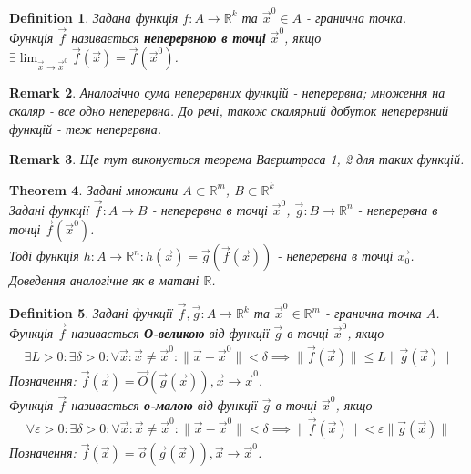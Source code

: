 \documentclass[a4paper, 10pt]{article}
\def\huge{\displaystyle}
\theoremstyle{theoremdd}
\newtheorem{theorem}{Theorem}[subsection]
\theoremstyle{theoremdd}
\theoremstyle{theoremdd}
\newtheorem{definition}[theorem]{Definition}
\theoremstyle{theoremdd}
\theoremstyle{theoremdd}
\theoremstyle{theoremdd}
\theoremstyle{theoremdd}
\newtheorem{remark}[theorem]{Remark}
\theoremstyle{theoremdd}
\theoremstyle{theoremdd}
\newcommand\Norm[1]{\|#1\|}
\begin{document}
\begin{definition}
Задана функція $f: A \to \mathbb{R}^k$ та $\vec{x}^0 \in A$ - гранична точка.\\
Функція $\vec{f}$ називається \textbf{неперервною в точці} $\vec{x}^0$, якщо $\exists \huge \lim_{\vec{x} \to \vec{x}^0} \vec{f}(\vec{x}) = \vec{f}(\vec{x}^0)$.
\end{definition}

\begin{remark}
Аналогічно сума неперервних функцій - неперервна; множення на скаляр - все одно неперервна. До речі, також скалярний добуток неперервний функцій - теж неперервна.
\end{remark}

\begin{remark}
Ще тут виконується теорема Ваєрштраса 1, 2 для таких функцій.
\end{remark}

\begin{theorem}
Задані множини $A \subset \mathbb{R}^m$, $B \subset \mathbb{R}^k$\\
Задані функції $\vec{f}: A \to B$ - неперервна в точці $\vec{x}^0$, $\vec{g}: B \to \mathbb{R}^n$ - неперервна в точці $\vec{f}(\vec{x}^0)$.\\
Тоді функція $h: A \to \mathbb{R}^n: h(\vec{x}) = \vec{g}(\vec{f}(\vec{x}))$ - неперервна в точці $\vec{x_0}$.\\
\textit{Доведення аналогічне як в матані $\mathbb{R}$.}
\end{theorem}

\begin{definition}
Задані функції $\vec{f},\vec{g}: A \to \mathbb{R}^k$ та $\vec{x}^0 \in \mathbb{R}^m$ - гранична точка $A$.\\
Функція $\vec{f}$ називається \textbf{О-великою} від функції $\vec{g}$ в точці $\vec{x}^0$, якщо
\begin{align*}
\exists L>0: \exists \delta > 0: \forall \vec{x}: \vec{x} \neq \vec{x}^0: \Norm{\vec{x} - \vec{x}^0} < \delta \implies \Norm{\vec{f}(\vec{x})} \leq L \Norm{\vec{g}(\vec{x})}
\end{align*}
Позначення: $\vec{f}(\vec{x}) = \vec{O}(\vec{g}(\vec{x})), \vec{x} \to \vec{x}^0$.\\
Функція $\vec{f}$ називається \textbf{о-малою} від функції $\vec{g}$ в точці $\vec{x}^0$, якщо
\begin{align*}
\forall \varepsilon>0: \exists \delta > 0: \forall \vec{x}: \vec{x} \neq \vec{x}^0: \Norm{\vec{x} - \vec{x}^0} < \delta \implies \Norm{\vec{f}(\vec{x})} < \varepsilon \Norm{\vec{g}(\vec{x})}
\end{align*}
Позначення: $\vec{f}(\vec{x}) = \vec{o}(\vec{g}(\vec{x})), \vec{x} \to \vec{x}^0$.
\end{definition}
\end{document}
